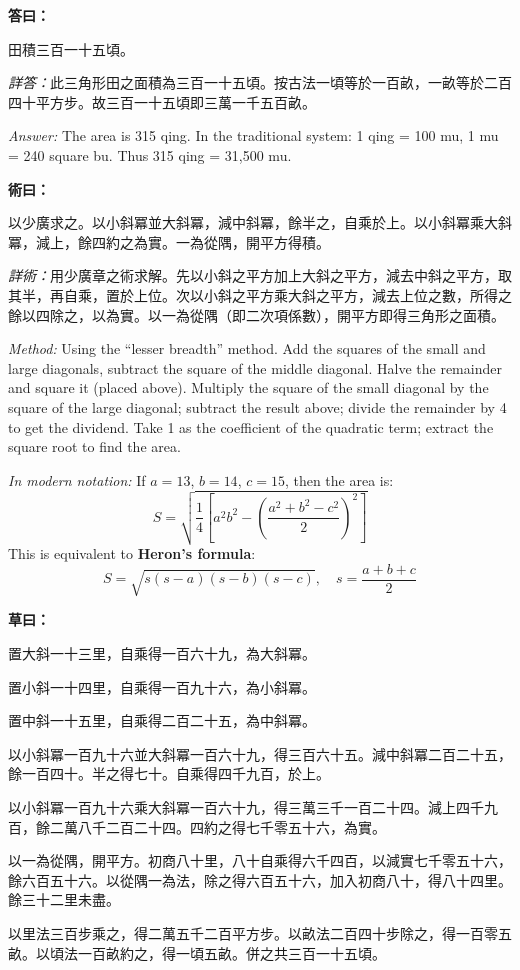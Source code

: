 \documentclass[11pt,a4paper]{article}
\newenvironment{answer}{%
  \medskip\noindent{\color{answercolor}\rule{0.5\textwidth}{0.5pt}}%
  \par\color{answercolor}%
}{%
  \par\medskip%
}
\newenvironment{method}{%
  \medskip\noindent{\color{methodcolor}\rule{0.5\textwidth}{0.5pt}}%
  \par\color{methodcolor}%
}{%
  \par\medskip%
}
\newenvironment{calculation}{%
  \medskip\noindent{\color{caocolor}\rule{0.4\textwidth}{0.4pt}}%
  \par\color{caocolor}%
}{%
  \par\medskip%
}
\begin{document}
\begin{answer}
\textbf{答曰：}

田積三百一十五頃。

\medskip
\textit{詳答：}此三角形田之面積為三百一十五頃。按古法一頃等於一百畝，一畝等於二百四十平方步。故三百一十五頃即三萬一千五百畝。

\medskip
\textit{Answer:} The area is 315 qing. In the traditional system: 1 qing = 100 mu, 1 mu = 240 square bu. Thus 315 qing = 31,500 mu.
\end{answer}

\begin{method}
\textbf{術曰：}

以少廣求之。以小斜冪並大斜冪，減中斜冪，餘半之，自乘於上。以小斜冪乘大斜冪，減上，餘四約之為實。一為從隅，開平方得積。

\medskip
\textit{詳術：}用少廣章之術求解。先以小斜之平方加上大斜之平方，減去中斜之平方，取其半，再自乘，置於上位。次以小斜之平方乘大斜之平方，減去上位之數，所得之餘以四除之，以為實。以一為從隅（即二次項係數），開平方即得三角形之面積。

\medskip
\textit{Method:} Using the ``lesser breadth'' method. Add the squares of the small and large diagonals, subtract the square of the middle diagonal. Halve the remainder and square it (placed above). Multiply the square of the small diagonal by the square of the large diagonal; subtract the result above; divide the remainder by 4 to get the dividend. Take 1 as the coefficient of the quadratic term; extract the square root to find the area.

\medskip
\textit{In modern notation:} If $a=13$, $b=14$, $c=15$, then the area is:
\[
S = \sqrt{\frac{1}{4}\left[a^2b^2 - \left(\frac{a^2+b^2-c^2}{2}\right)^2\right]}
\]
This is equivalent to \textbf{Heron's formula}:
\[
S = \sqrt{s(s-a)(s-b)(s-c)}, \quad s = \frac{a+b+c}{2}
\]
\end{method}

\begin{calculation}
\textbf{草曰：}

置大斜一十三里，自乘得一百六十九，為大斜冪。

置小斜一十四里，自乘得一百九十六，為小斜冪。

置中斜一十五里，自乘得二百二十五，為中斜冪。

以小斜冪一百九十六並大斜冪一百六十九，得三百六十五。減中斜冪二百二十五，餘一百四十。半之得七十。自乘得四千九百，於上。

以小斜冪一百九十六乘大斜冪一百六十九，得三萬三千一百二十四。減上四千九百，餘二萬八千二百二十四。四約之得七千零五十六，為實。

以一為從隅，開平方。初商八十里，八十自乘得六千四百，以減實七千零五十六，餘六百五十六。以從隅一為法，除之得六百五十六，加入初商八十，得八十四里。餘三十二里未盡。

以里法三百步乘之，得二萬五千二百平方步。以畝法二百四十步除之，得一百零五畝。以頃法一百畝約之，得一頃五畝。併之共三百一十五頃。
\end{calculation}
\end{document}
